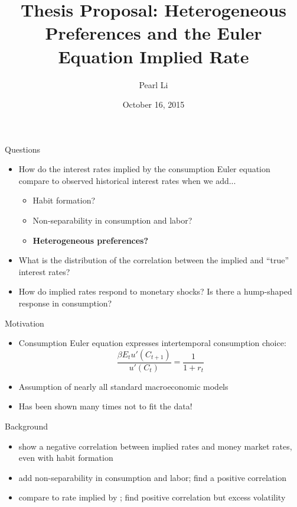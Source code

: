 \documentclass{beamer}
\title[Euler Equations]{Thesis Proposal: Heterogeneous Preferences and the Euler Equation Implied Rate}
\author[Li]{Pearl Li}
\date{October 16, 2015}
\begin{document}
\begin{frame}
\titlepage
\end{frame}

\begin{frame}{Questions}
\begin{itemize}
\item How do the interest rates implied by the consumption Euler equation compare to observed historical interest rates when we add...
    \begin{itemize}
    \item Habit formation?
    \item Non-separability in consumption and labor?
    \item \textbf{Heterogeneous preferences?}
    \end{itemize}
\item What is the distribution of the correlation between the implied and ``true'' interest rates?
\item How do implied rates respond to monetary shocks? Is there a hump-shaped response in consumption?
\end{itemize}
\end{frame}

\begin{frame}{Motivation}
\begin{itemize}
\item Consumption Euler equation expresses intertemporal consumption choice: $$\frac{\beta E_t u'(C_{t+1})}{u'(C_t)} = \frac{1}{1+r_t}$$
\item Assumption of nearly all standard macroeconomic models
\item Has been shown many times not to fit the data!
\end{itemize}
\end{frame}

\begin{frame}{Background}
\begin{itemize}
\item \cite{canzoneri07} show a negative correlation between implied rates and money market rates, even with habit formation
\item \cite{collard11} add non-separability in consumption and labor; find a positive correlation
\item \cite{gareis13} compare to rate implied by \cite{smets07}; find positive correlation but excess volatility
\end{itemize}
\end{frame}
\end{document}
